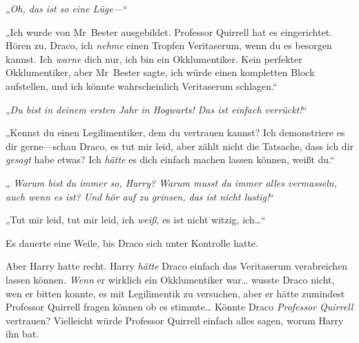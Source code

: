 „\emph{Oh, das ist so eine Lüge—}“

„Ich wurde von Mr~Bester ausgebildet. Professor Quirrell hat es eingerichtet. Hören zu, Draco, ich \emph{nehme} einen Tropfen Veritaserum, wenn du es besorgen kannst. Ich \emph{warne} dich nur, ich bin ein Okklumentiker. Kein perfekter Okklumentiker, aber Mr~Bester sagte, ich würde einen kompletten Block aufstellen, und ich könnte wahrscheinlich Veritaserum schlagen.“

„\emph{Du bist in deinem ersten Jahr in Hogwarts! Das ist einfach verrückt!}“

„Kennst du einen Legilimentiker, dem du vertrauen kannst? Ich demonstriere es dir gerne—schau Draco, es tut mir leid, aber zählt nicht die Tatsache, dass ich dir \emph{gesagt} habe etwas? Ich \emph{hätte} es dich einfach machen lassen können, weißt du.“

„\emph{ Warum bist du immer so, Harry? Warum musst du immer alles vermasseln, auch wenn es  ist? Und hör auf zu grinsen, das ist nicht lustig!}“

„Tut mir leid, tut mir leid, ich \emph{weiß}, es ist nicht witzig, ich…“

Es dauerte eine Weile, bis Draco sich unter Kontrolle hatte.

Aber Harry hatte recht. Harry \emph{hätte} Draco einfach das Veritaserum verabreichen lassen können. \emph{Wenn} er wirklich ein Okklumentiker war… wusste Draco nicht, wen er bitten konnte, es mit Legilimentik zu versuchen, aber er hätte zumindest Professor Quirrell fragen können ob es stimmte… Könnte Draco \emph{Professor Quirrell} vertrauen? Vielleicht würde Professor Quirrell einfach alles sagen, worum Harry ihn bat.

